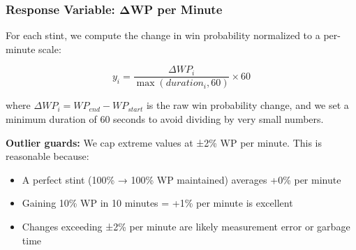 \documentclass[
  letterpaper,
  DIV=11,
  numbers=noendperiod]{scrartcl}
\newenvironment{Shaded}{\begin{snugshade}}{\end{snugshade}}
\newcommand{\AttributeTok}[1]{\textcolor[rgb]{0.40,0.45,0.13}{#1}}
\newcommand{\DecValTok}[1]{\textcolor[rgb]{0.68,0.00,0.00}{#1}}
\newcommand{\FloatTok}[1]{\textcolor[rgb]{0.68,0.00,0.00}{#1}}
\newcommand{\FunctionTok}[1]{\textcolor[rgb]{0.28,0.35,0.67}{#1}}
\newcommand{\NormalTok}[1]{\textcolor[rgb]{0.00,0.23,0.31}{#1}}
\newcommand{\OtherTok}[1]{\textcolor[rgb]{0.00,0.23,0.31}{#1}}
\newcommand{\SpecialCharTok}[1]{\textcolor[rgb]{0.37,0.37,0.37}{#1}}
\newcommand{\StringTok}[1]{\textcolor[rgb]{0.13,0.47,0.30}{#1}}
\providecommand{\tightlist}{%
  \setlength{\itemsep}{0pt}\setlength{\parskip}{0pt}}
\begin{document}
\begin{Shaded}
\end{Shaded}

\subsubsection{Response Variable: ΔWP per
Minute}\label{response-variable-ux3b4wp-per-minute}

For each stint, we compute the change in win probability normalized to a
per-minute scale:

\[y_i = \frac{\Delta WP_i}{\max(duration_i, 60)} \times 60\]

where \(\Delta WP_i = WP_{end} - WP_{start}\) is the raw win probability
change, and we set a minimum duration of 60 seconds to avoid dividing by
very small numbers.

\textbf{Outlier guards:} We cap extreme values at ±2\% WP per minute.
This is reasonable because:

\begin{itemize}
\tightlist
\item
  A perfect stint (100\% → 100\% WP maintained) averages +0\% per minute
\item
  Gaining 10\% WP in 10 minutes = +1\% per minute is excellent
\item
  Changes exceeding ±2\% per minute are likely measurement error or
  garbage time
\end{itemize}
\end{document}

